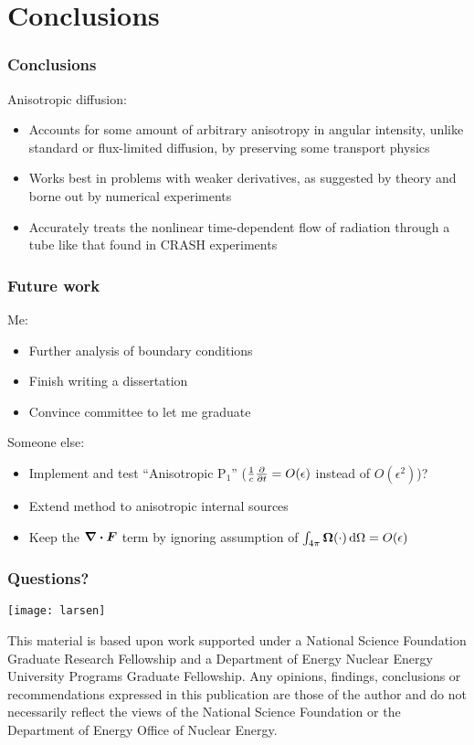 \documentclass{beamer}
\begin{document}
\section{Conclusions}
\begin{frame}
  \frametitle{Conclusions}
  Anisotropic diffusion:
  \begin{itemize}
    \item Accounts for some amount of arbitrary anisotropy in
      angular intensity, unlike standard or flux-limited diffusion, by
      preserving some transport physics
    \item Works best in problems with weaker derivatives, as suggested by
      theory and borne out by numerical experiments
    \item Accurately treats the nonlinear time-dependent flow of radiation
      through a tube like that found in CRASH experiments
  \end{itemize}
\end{frame}
\begin{frame}
  \frametitle{Future work}
  Me:
  \begin{itemize}
    \item Further analysis of boundary conditions
    \item Finish writing a dissertation
    \item Convince committee to let me graduate
  \end{itemize}
  Someone else:
  \begin{itemize}
    \item Implement and test ``Anisotropic P$_1$''
      ($\frac1c\frac{\partial }{\partial t}=O(\epsilon)$ instead of $O(\epsilon^2)$)?
    \item Extend method to anisotropic internal sources
    \item Keep the $\bm{\nabla} \bm{\cdot} \bm{F}$ term by ignoring assumption of
      $\int_{4\pi} \bm{\Omega} (\cdot) \mathop{}\!\mathrm{d}\Omega = O(\epsilon)$ 
  \end{itemize}
\end{frame}
\appendix
\begin{frame}
  \frametitle{Questions?}

{\par\centering%
  \texttt{[image: larsen]}

}
{\vspace{-.25in}%
\setlength{\baselineskip}{-\baselineskip} \tiny 
This material is based upon work supported under a National Science Foundation
Graduate Research Fellowship and a Department of Energy Nuclear Energy
University Programs Graduate Fellowship. Any opinions, findings, conclusions or
recommendations expressed in this publication are those of the author and do
not necessarily reflect the views of the National Science Foundation or the
Department of Energy Office of Nuclear Energy.\par}
\end{frame}
\end{document}
